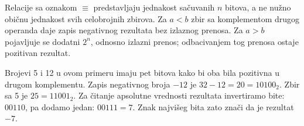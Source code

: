 Relacije sa oznakom $\equiv$ predstavljaju jednakost sačuvanih $n$ bitova, a ne nužno običnu jednakost svih celobrojnih zbirova. Za $a<b$ zbir sa komplementom drugog operanda daje zapis negativnog rezultata bez izlaznog prenosa. Za $a>b$ pojavljuje se dodatni $2^n$, odnosno izlazni prenos; odbacivanjem tog prenosa ostaje pozitivan rezultat.

Brojevi 5 i 12 u ovom primeru imaju pet bitova kako bi oba bila pozitivna u drugom komplementu. Zapis negativnog broja $-12$ je $32-12=20=10100_2$. Zbir sa 5 je $25=11001_2$. Za čitanje apsolutne vrednosti rezultata invertiramo bite: $00110$, pa dodamo jedan: $00111=7$. Znak najvišeg bita zato znači da je rezultat $-7$.
